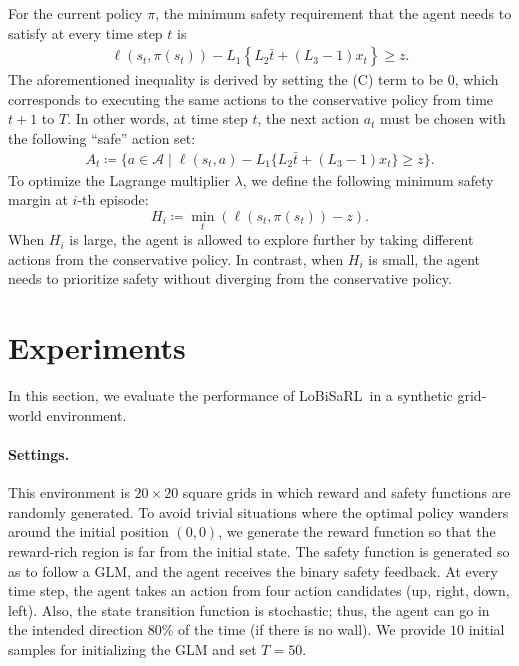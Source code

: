 \documentclass[letterpaper]{article} %
\newcommand{\cA}{\mathcal{A}}
\newcommand{\algo}{\textsf{LoBiSaRL}}
\begin{document}
For the current policy $\pi$, the minimum safety requirement that the agent needs to satisfy at every time step $t$ is
%
\begin{align}
    \label{eq:safety_constraint_checked}
    \ell(s_t, \pi(s_t)) - L_1 \left\{ L_2 \bar{t} + (L_3 - 1) x_{t} \right\} \ge z.
\end{align}
%
The aforementioned inequality is derived by setting the (C) term to be $0$, which corresponds to executing the same actions to the conservative policy from time $t+1$ to $T$.
In other words, at time step $t$, the next action $a_t$ must be chosen with the following ``safe'' action set:
%
\begin{align*}
    \label{eq:safe_action_set}
    A_t \coloneqq \{a \in \cA \mid \ell(s_t, a) - L_1 \{L_2\bar{t} + (L_3 -1) x_t \} \ge z \}.
\end{align*}
%
\noindent
To optimize the Lagrange multiplier $\lambda$, we define the following minimum safety margin at $i$-th episode:
%
\begin{equation*}
    H_i \coloneqq \min_t \left(\ell(s_t, \pi(s_t)) - z \right).
\end{equation*}
%
When $H_i$ is large, the agent is allowed to explore further by taking different actions from the conservative policy.
In contrast, when $H_i$ is small, the agent needs to prioritize safety without diverging from the conservative policy.

\section{Experiments}

In this section, we evaluate the performance of \algo~in a synthetic grid-world environment.

\paragraph{Settings.}
This environment is $20 \times 20$ square grids in which reward and safety functions are randomly generated.
To avoid trivial situations where the optimal policy wanders around the initial position $(0, 0)$, we generate the reward function so that the reward-rich region is far from the initial state.
The safety function is generated so as to follow a GLM, and the agent receives the binary safety feedback.
At every time step, the agent takes an action from four action candidates (up, right, down, left).
Also, the state transition function is stochastic; thus, the agent can go in the intended direction 80\% of the time (if there is no wall).
We provide $10$ initial samples for initializing the GLM and set $T=50$.
\end{document}
